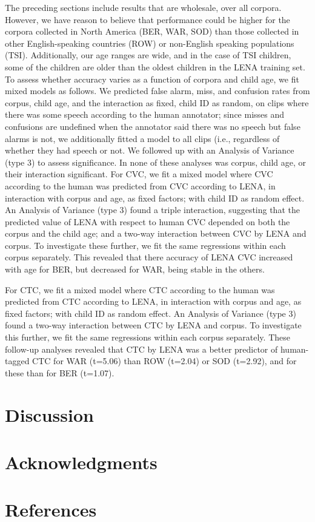 \documentclass[english,floatsintext,man]{apa6}
\begin{document}
The preceding sections include results that are wholesale, over all
corpora. However, we have reason to believe that performance could be
higher for the corpora collected in North America (BER, WAR, SOD) than
those collected in other English-speaking countries (ROW) or non-English
speaking populations (TSI). Additionally, our age ranges are wide, and
in the case of TSI children, some of the children are older than the
oldest children in the LENA training set. To assess whether accuracy
varies as a function of corpora and child age, we fit mixed models as
follows. We predicted false alarm, miss, and confusion rates from
corpus, child age, and the interaction as fixed, child ID as random, on
clips where there was some speech according to the human annotator;
since misses and confusions are undefined when the annotator said there
was no speech but false alarms is not, we additionally fitted a model to
all clips (i.e., regardless of whether they had speech or not. We
followed up with an Analysis of Variance (type 3) to assess
significance. In none of these analyses was corpus, child age, or their
interaction significant. For CVC, we fit a mixed model where CVC
according to the human was predicted from CVC according to LENA, in
interaction with corpus and age, as fixed factors; with child ID as
random effect. An Analysis of Variance (type 3) found a triple
interaction, suggesting that the predicted value of LENA with respect to
human CVC depended on both the corpus and the child age; and a two-way
interaction between CVC by LENA and corpus. To investigate these
further, we fit the same regressions within each corpus separately. This
revealed that there accuracy of LENA CVC increased with age for BER, but
decreased for WAR, being stable in the others.

For CTC, we fit a mixed model where CTC according to the human was
predicted from CTC according to LENA, in interaction with corpus and
age, as fixed factors; with child ID as random effect. An Analysis of
Variance (type 3) found a two-way interaction between CTC by LENA and
corpus. To investigate this further, we fit the same regressions within
each corpus separately. These follow-up analyses revealed that CTC by
LENA was a better predictor of human-tagged CTC for WAR (t=5.06) than
ROW (t=2.04) or SOD (t=2.92), and for these than for BER (t=1.07).

\section{Discussion}\label{discussion}

\section{Acknowledgments}\label{acknowledgments}

\newpage

\section{References}\label{references}

\setlength{\parindent}{-0.5in} \setlength{\leftskip}{0.5in}
\end{document}
